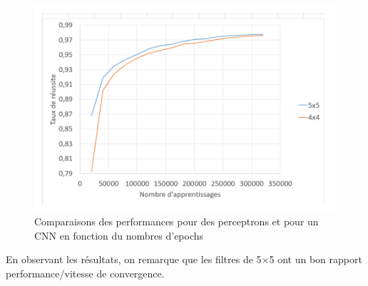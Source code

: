 \newpage

\begin{figure}[h]
    \center 
    \includegraphics{img/comparaison_filtres.png}
    \caption{Comparaisons des performances pour des perceptrons et pour un CNN en fonction du nombres d'epochs}
\end{figure}

En observant les résultats, on remarque que les filtres de 5$\times$5 ont un bon rapport performance/vitesse de convergence.